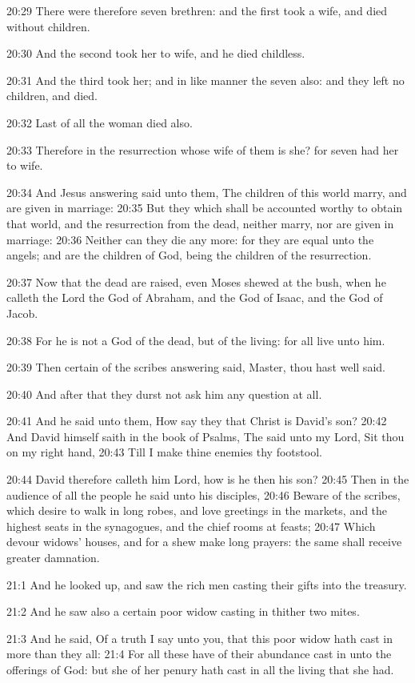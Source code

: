 20:29 There were therefore seven brethren: and the first took a wife,
and died without children.

20:30 And the second took her to wife, and he died childless.

20:31 And the third took her; and in like manner the seven also: and
they left no children, and died.

20:32 Last of all the woman died also.

20:33 Therefore in the resurrection whose wife of them is she? for
seven had her to wife.

20:34 And Jesus answering said unto them, The children of this world
marry, and are given in marriage: 20:35 But they which shall be
accounted worthy to obtain that world, and the resurrection from the
dead, neither marry, nor are given in marriage: 20:36 Neither can they
die any more: for they are equal unto the angels; and are the children
of God, being the children of the resurrection.

20:37 Now that the dead are raised, even Moses shewed at the bush,
when he calleth the Lord the God of Abraham, and the God of Isaac, and
the God of Jacob.

20:38 For he is not a God of the dead, but of the living: for all live
unto him.

20:39 Then certain of the scribes answering said, Master, thou hast
well said.

20:40 And after that they durst not ask him any question at all.

20:41 And he said unto them, How say they that Christ is David's son?
20:42 And David himself saith in the book of Psalms, The \LORD said
unto my Lord, Sit thou on my right hand, 20:43 Till I make thine
enemies thy footstool.

20:44 David therefore calleth him Lord, how is he then his son?  20:45
Then in the audience of all the people he said unto his disciples,
20:46 Beware of the scribes, which desire to walk in long robes, and
love greetings in the markets, and the highest seats in the
synagogues, and the chief rooms at feasts; 20:47 Which devour widows'
houses, and for a shew make long prayers: the same shall receive
greater damnation.

21:1 And he looked up, and saw the rich men casting their gifts into
the treasury.

21:2 And he saw also a certain poor widow casting in thither two
mites.

21:3 And he said, Of a truth I say unto you, that this poor widow hath
cast in more than they all: 21:4 For all these have of their abundance
cast in unto the offerings of God: but she of her penury hath cast in
all the living that she had.

